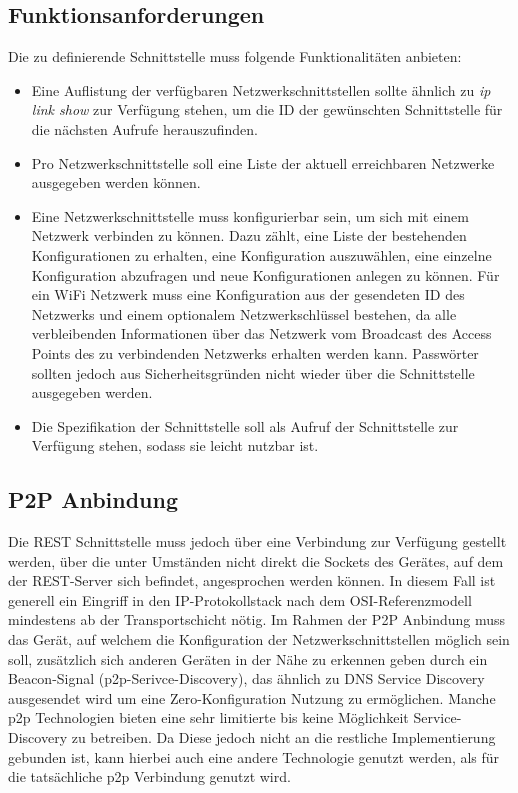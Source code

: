 	\subsection{Funktionsanforderungen}

    Die zu definierende Schnittstelle muss folgende Funktionalitäten anbieten:
    \begin{itemize}
        \item Eine Auflistung der verfügbaren Netzwerkschnittstellen sollte ähnlich zu {\it ip link show} zur Verfügung stehen, um die ID der gewünschten Schnittstelle für die nächsten Aufrufe herauszufinden.
        \item Pro Netzwerkschnittstelle soll eine Liste der aktuell erreichbaren Netzwerke ausgegeben werden können.
        \item Eine Netzwerkschnittstelle muss konfigurierbar sein, um sich mit einem Netzwerk verbinden zu können. Dazu zählt, eine Liste der bestehenden Konfigurationen zu erhalten, eine Konfiguration auszuwählen, eine einzelne Konfiguration abzufragen und neue Konfigurationen anlegen zu können. Für ein WiFi Netzwerk muss eine Konfiguration aus der gesendeten ID des Netzwerks und einem optionalem Netzwerkschlüssel bestehen, da alle verbleibenden Informationen über das Netzwerk vom Broadcast des Access Points des zu verbindenden Netzwerks erhalten werden kann.
        Passwörter sollten jedoch aus Sicherheitsgründen nicht wieder über die Schnittstelle ausgegeben werden.
        
        \item Die Spezifikation der Schnittstelle soll als Aufruf der Schnittstelle zur Verfügung stehen, sodass sie leicht nutzbar ist.
    \end{itemize}
    
    \subsection{P2P Anbindung}

	Die REST Schnittstelle muss jedoch über eine Verbindung zur Verfügung gestellt werden, über die unter Umständen nicht direkt die Sockets des Gerätes, auf dem der REST-Server sich befindet, angesprochen werden können. In diesem Fall ist generell ein Eingriff in den IP-Protokollstack nach dem OSI-Referenzmodell mindestens ab der Transportschicht nötig. Im Rahmen der P2P Anbindung muss das Gerät, auf welchem die Konfiguration der Netzwerkschnittstellen möglich sein soll, zusätzlich sich anderen Geräten in der Nähe zu erkennen geben durch ein Beacon-Signal (p2p-Serivce-Discovery), das ähnlich zu DNS Service Discovery ausgesendet wird um eine Zero-Konfiguration Nutzung zu ermöglichen.\cite{Kaiser} Manche p2p Technologien bieten eine sehr limitierte bis keine Möglichkeit Service-Discovery zu betreiben. Da Diese jedoch nicht an die restliche Implementierung gebunden ist, kann hierbei auch eine andere Technologie genutzt werden, als für die tatsächliche p2p Verbindung genutzt wird.

